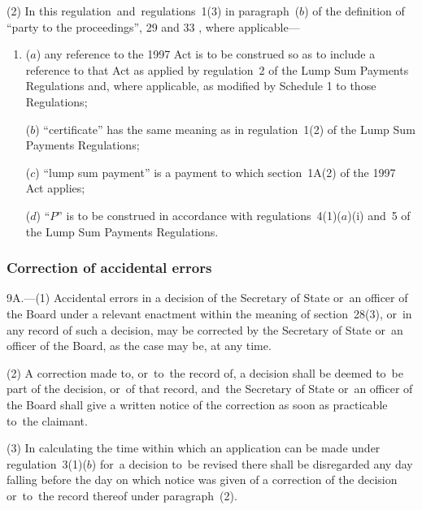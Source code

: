 \documentclass[12pt,a4paper]{article}
\begin{document}
(2) In this regulation~and~regulations~1(3) in paragraph~($b$)  of the definition of “party to the proceedings”, 
29 and 33%
, where applicable—
\begin{enumerate}\item[]
($a$) any reference to the 1997 Act is to be construed so as to include a reference to that Act as applied by regulation~2 of the Lump Sum Payments Regulations and, where applicable, as modified by Schedule 1 to those Regulations;

($b$) “certificate” has the same meaning as in regulation~1(2) of the Lump Sum Payments Regulations;

($c$) “lump sum payment” is a payment to which section~1A(2) of the 1997 Act  applies;

($d$) “$P$” is to be construed in accordance with regulations~4(1)($a$)(i)  and~5 of the Lump Sum Payments Regulations.
\end{enumerate}


\subsubsection[9A. Correction of accidental errors]{Correction of accidental errors}

9A.---(1)  Accidental errors in a decision of the Secretary of State or~an officer of the Board under a relevant enactment within the meaning of section~28(3), or~in any record of such a decision, may be corrected by the Secretary of State or~an officer of the Board, as the case may be, at any time.

(2) A correction made to, or~to~the record of, a decision shall be deemed to~be part of the decision, or~of that record, and~the Secretary of State or~an officer of the Board shall give a written notice of the correction as soon as practicable to~the claimant.

(3) In calculating the time within which an application can be made under regulation~3(1)($b$)  for~a decision to~be revised
there shall be disregarded any day falling before the day on which notice was given of a correction of the decision or~to~the record thereof under paragraph~(2).
\end{document}
